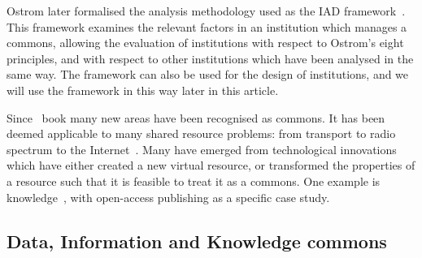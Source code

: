 Ostrom later formalised the analysis methodology used as the \ac{IAD} framework~\citep{Ostrom2005}. 
This framework examines the relevant factors in an institution which manages a commons, allowing the evaluation of institutions with respect to Ostrom's eight principles, and with respect to other institutions which have been analysed in the same way. 
The framework can also be used for the design of institutions, and we will use the framework in this way later in this article.

Since~ book many new areas have been recognised as commons. It has been deemed applicable to many shared resource problems: from transport to radio spectrum to the Internet~\citep{Hess2000}. 
Many have emerged from technological innovations which have either created a new virtual resource, or transformed the properties of a resource such that it is feasible to treat it as a commons. One example is knowledge~\citep{Hess2007}, with open-access publishing as a specific case study. 



\subsection{Data, Information and Knowledge commons}

